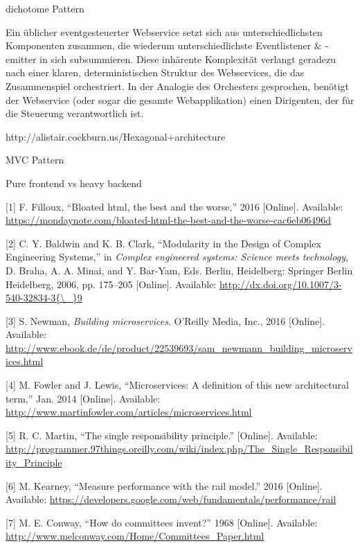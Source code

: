 \documentclass[]{article}
\begin{document}
dichotome Pattern

Ein üblicher eventgesteuerter Webservice setzt sich aus
unterschiedlichsten Komponenten zusammen, die wiederum
unterschiedlichste Eventlistener \& -emitter in sich subsummieren. Diese
inhärente Komplexität verlangt geradezu nach einer klaren,
deterministischen Struktur des Webservices, die das Zusammenspiel
orchestriert. In der Analogie des Orchesters gesprochen, benötigt der
Webservice (oder sogar die gesamte Webapplikation) einen Dirigenten, der
für die Steuerung verantwortlich ist.

http://alistair.cockburn.us/Hexagonal+architecture

MVC Pattern

Pure frontend vs heavy backend

\hypertarget{refs}{}
\hypertarget{ref-Filloux2016}{}
{[}1{]} F. Filloux, ``Bloated html, the best and the worse,'' 2016
{[}Online{]}. Available:
\url{https://mondaynote.com/bloated-html-the-best-and-the-worse-cac6eb06496d}

\hypertarget{ref-Baldwin2006}{}
{[}2{]} C. Y. Baldwin and K. B. Clark, ``Modularity in the Design of
Complex Engineering Systems,'' in \emph{Complex engineered systems:
Science meets technology}, D. Braha, A. A. Minai, and Y. Bar-Yam, Eds.
Berlin, Heidelberg: Springer Berlin Heidelberg, 2006, pp. 175--205
{[}Online{]}. Available:
\href{http://dx.doi.org/10.1007/3-540-32834-3\%7B/_\%7D9}{http://dx.doi.org/10.1007/3-540-32834-3\{\textbackslash{}\_\}9}

\hypertarget{ref-Newman2015}{}
{[}3{]} S. Newman, \emph{Building microservices}. O'Reilly Media, Inc.,
2016 {[}Online{]}. Available:
\url{http://www.ebook.de/de/product/22539693/sam_newmann_building_microservices.html}

\hypertarget{ref-Fowler2014}{}
{[}4{]} M. Fowler and J. Lewis, ``Microservices: A definition of this
new architectural term,'' Jan. 2014 {[}Online{]}. Available:
\url{http://www.martinfowler.com/articles/microservices.html}

\hypertarget{ref-Martin}{}
{[}5{]} R. C. Martin, ``The single responsibility principle.''
{[}Online{]}. Available:
\url{http://programmer.97things.oreilly.com/wiki/index.php/The_Single_Responsibility_Principle}

\hypertarget{ref-Kearney2016}{}
{[}6{]} M. Kearney, ``Measure performance with the rail model.'' 2016
{[}Online{]}. Available:
\url{https://developers.google.com/web/fundamentals/performance/rail}

\hypertarget{ref-Conway1968}{}
{[}7{]} M. E. Conway, ``How do committees invent?'' 1968 {[}Online{]}.
Available: \url{http://www.melconway.com/Home/Committees_Paper.html}
\end{document}
